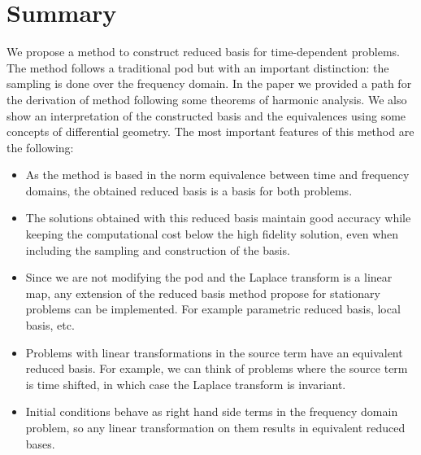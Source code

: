 \section{Summary} \label{sec:Summary}

    We propose a method to construct reduced basis for time-dependent problems. The method follows a traditional \gls{pod} but with an important distinction: the sampling is done over the frequency domain. In the paper we provided a path for the derivation of method following some theorems of harmonic analysis. We also show an interpretation of the constructed basis and the equivalences using some concepts of differential geometry.
    The most important features of this method are the following:
\begin{itemize}    
    \item As the method is based in the norm equivalence between time and frequency domains, the obtained reduced basis is a basis for both problems. 
	\item The solutions obtained with this reduced basis maintain good accuracy while keeping the computational cost below the high fidelity solution, even when including the sampling and construction of the basis.
    \item Since we are not modifying the \gls{pod} and the Laplace transform is a linear map, any extension of the reduced basis method propose for stationary problems can be implemented. For example parametric reduced basis, local basis, etc.
    \item Problems with linear transformations in the source term have an equivalent reduced basis. For example, we can think of problems where the source term is time shifted, in which case the Laplace transform is invariant.
    \item Initial conditions behave as right hand side terms in the frequency domain problem, so any linear transformation on them results in equivalent reduced bases.
\end{itemize}



